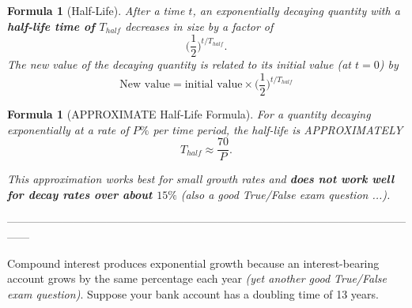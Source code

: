 \documentclass[12pt]{article}
\newtheorem{formula}[theorem]{Formula}
\begin{document}
\begin{formula}[Half-Life]
After a time $t$, an exponentially decaying quantity with a {\bf half-life time of $T_{half}$} decreases in size by a factor of $$\Big(\frac{1}{2}\Big)^{t / T_{half}}.$$ The new value of the decaying quantity is related to its initial value (at $t=0$) by
\begin{equation}\label{eq:half_life}
	\text{New value} = \text{initial value} \times \Big(\frac{1}{2}\Big)^{t / T_{half}}
\end{equation}


\end{formula}

\begin{formula}[APPROXIMATE Half-Life Formula]
For a quantity decaying exponentially at a rate of $P\%$ per time period, the half-life is APPROXIMATELY
\begin{equation}\label{eq:approximate_half_life}
	T_{half} \approx \frac{70}{P}.
\end{equation}

This approximation works best for small growth rates and {\bf does not work well for decay rates over about $15\%$} (also a good True/False exam question ...).

\end{formula}


------------------------------------------------------------------------------------------------------------------

Compound interest produces exponential growth because an interest-bearing account grows by the same percentage each year \emph{(yet another good True/False exam question)}. Suppose your bank account has a doubling time of 13 years.
\end{document}

